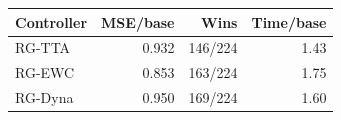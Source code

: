 \begin{tabular}{lrrr}
\toprule
Controller & MSE/base & Wins & Time/base \\
\midrule
RG-TTA & 0.932 & 146/224 & 1.43 \\
RG-EWC & 0.853 & 163/224 & 1.75 \\
RG-Dyna & 0.950 & 169/224 & 1.60 \\
\bottomrule
\end{tabular}
